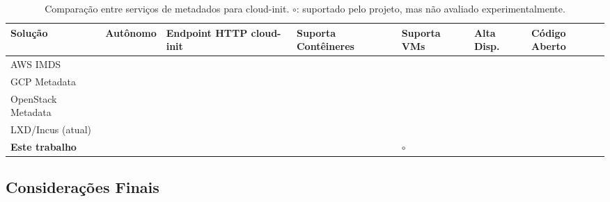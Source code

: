 \begin{table}[ht!]
\centering
\small
\setlength{\tabcolsep}{4pt}
\renewcommand{\arraystretch}{1.3}
\caption{Comparação entre serviços de metadados para cloud-init. $\circ$: suportado pelo projeto, mas não avaliado experimentalmente.}
\vspace{0.5em}
\label{tab:comparacao}
\def\cellZ{\cellcolor{black!10}\xmark}
\def\cellO{\cmark}
\begin{tabular}{>{\raggedright\arraybackslash}p{2.7cm} >{\centering\arraybackslash}p{1.75cm} >{\centering\arraybackslash}p{2.0cm} >{\centering\arraybackslash}p{2.15cm} >{\centering\arraybackslash}p{1.5cm} >{\centering\arraybackslash}p{1.3cm} >{\centering\arraybackslash}p{1.5cm}}
    \toprule
    \textbf{Solução} & \textbf{Autônomo} & \textbf{Endpoint HTTP cloud-init} & \textbf{Suporta Contêineres} & \textbf{Suporta VMs} & \textbf{Alta Disp.} & \textbf{Código Aberto} \\
    \midrule
    AWS IMDS            & \cellZ & \cellO & \cellZ & \cellO & \cellO & \cellZ \\
    GCP Metadata        & \cellZ & \cellO & \cellZ & \cellO & \cellO & \cellZ \\
    OpenStack Metadata  & \cellZ & \cellO & \cellZ & \cellO & \cellO & \cellO \\
    LXD/Incus (atual)   & \cellO & \cellZ & \cellO & \cellO & \cellZ & \cellO \\
    \textbf{Este trabalho} & \cellO & \cellO & \cellO & $\circ$ & \cellO & \cellO \\
    \bottomrule
\end{tabular}
\end{table}

\subsection{Considerações Finais}

